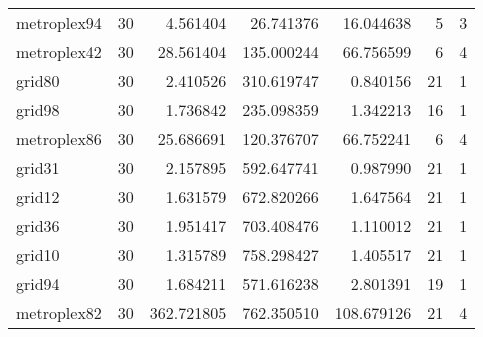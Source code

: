 \documentclass[../../../thesis.tex]{subfiles}
\begin{document}
\begin{longtable}{|l|r|r|r|r|r|r|}
metroplex94 & 30 & 4.561404 & 26.741376 & 16.044638 & 5 & 3 \\
metroplex42 & 30 & 28.561404 & 135.000244 & 66.756599 & 6 & 4 \\
grid80 & 30 & 2.410526 & 310.619747 & 0.840156 & 21 & 1 \\
grid98 & 30 & 1.736842 & 235.098359 & 1.342213 & 16 & 1 \\
metroplex86 & 30 & 25.686691 & 120.376707 & 66.752241 & 6 & 4 \\
grid31 & 30 & 2.157895 & 592.647741 & 0.987990 & 21 & 1 \\
grid12 & 30 & 1.631579 & 672.820266 & 1.647564 & 21 & 1 \\
grid36 & 30 & 1.951417 & 703.408476 & 1.110012 & 21 & 1 \\
grid10 & 30 & 1.315789 & 758.298427 & 1.405517 & 21 & 1 \\
grid94 & 30 & 1.684211 & 571.616238 & 2.801391 & 19 & 1 \\
metroplex82 & 30 & 362.721805 & 762.350510 & 108.679126 & 21 & 4 \\
\end{longtable}
\end{document}
